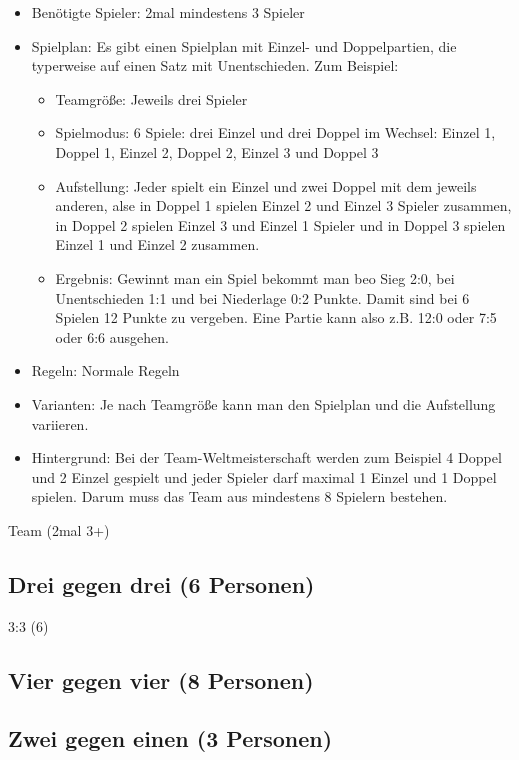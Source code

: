 \begin{itemize}
\item Benötigte Spieler: 2mal mindestens 3 Spieler
\item Spielplan: Es gibt einen Spielplan mit Einzel- und Doppelpartien, die typerweise auf einen Satz mit Unentschieden. Zum Beispiel:
\begin{itemize}
\item Teamgröße: Jeweils drei Spieler
\item Spielmodus: 6 Spiele: drei Einzel und drei Doppel im Wechsel: Einzel 1, Doppel 1, Einzel 2, Doppel 2, Einzel 3 und Doppel 3
\item Aufstellung: Jeder spielt ein Einzel und zwei Doppel mit dem jeweils anderen, alse in Doppel 1 spielen Einzel 2 und Einzel 3 Spieler zusammen, in Doppel 2 spielen Einzel 3 und Einzel 1 Spieler und in Doppel 3 spielen Einzel 1 und Einzel 2 zusammen.  
\item Ergebnis: Gewinnt man ein Spiel bekommt man beo Sieg 2:0, bei Unentschieden 1:1 und bei Niederlage 0:2 Punkte. Damit sind bei 6 Spielen 12 Punkte zu vergeben. Eine Partie kann also z.B. 12:0 oder 7:5 oder 6:6 ausgehen. 
\end{itemize}
\item Regeln: Normale Regeln 
\item Varianten: Je nach Teamgröße kann man den Spielplan und die Aufstellung variieren. 
\item Hintergrund: Bei der Team-Weltmeisterschaft werden zum Beispiel 4 Doppel und 2 Einzel gespielt und jeder Spieler darf maximal 1 Einzel und 1 Doppel spielen. Darum muss das Team aus mindestens 8 Spielern bestehen. 
\end{itemize}
 
Team (2mal 3+)

\subsection{Drei gegen drei (6 Personen)}
\label{spielformen:npersonen:dreigegendrei}
3:3 (6)

\subsection{Vier gegen vier (8 Personen)}
\label{spielformen:npersonen:viergegenvier}

\subsection{Zwei gegen einen (3 Personen)}
\label{spielformen:npersonen:zweigegeneinen}

